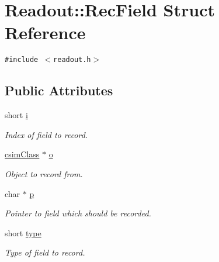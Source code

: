 \hypertarget{structReadout_1_1RecField}{
\section{Readout::Rec\-Field Struct Reference}
\label{structReadout_1_1RecField}
}
{\tt \#include $<$readout.h$>$}

\subsection*{Public Attributes}
\begin{CompactItemize}
\item 
\hypertarget{structReadout_1_1RecField_o0}{
short \hyperlink{structReadout_1_1RecField_o0}{i}}
\label{structReadout_1_1RecField_o0}

\begin{CompactList}\small\item\em Index of field to record. \item\end{CompactList}\item 
\hypertarget{structReadout_1_1RecField_o1}{
\hyperlink{classcsimClass}{csim\-Class} $\ast$ \hyperlink{structReadout_1_1RecField_o1}{o}}
\label{structReadout_1_1RecField_o1}

\begin{CompactList}\small\item\em Object to record from. \item\end{CompactList}\item 
\hypertarget{structReadout_1_1RecField_o2}{
char $\ast$ \hyperlink{structReadout_1_1RecField_o2}{p}}
\label{structReadout_1_1RecField_o2}

\begin{CompactList}\small\item\em Pointer to field which should be recorded. \item\end{CompactList}\item 
\hypertarget{structReadout_1_1RecField_o3}{
short \hyperlink{structReadout_1_1RecField_o3}{type}}
\label{structReadout_1_1RecField_o3}

\begin{CompactList}\small\item\em Type of field to record. \item\end{CompactList}\end{CompactItemize}
